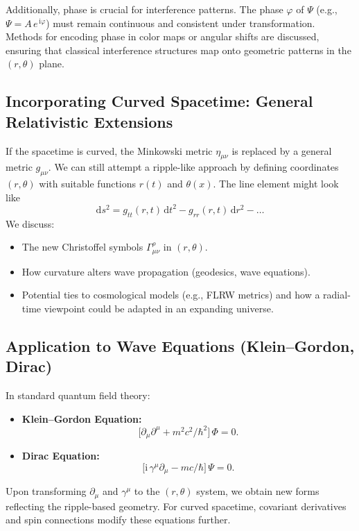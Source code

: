 \documentclass[11pt]{article}
\begin{document}
Additionally, phase is crucial for interference patterns. The phase 
\(\varphi\) of \(\Psi\) (e.g., \(\Psi = A \, e^{\,\mathrm{i}\varphi}\)) 
must remain continuous and consistent under transformation. Methods for 
encoding phase in color maps or angular shifts are discussed, ensuring 
that classical interference structures map onto geometric patterns in the 
\((r,\theta)\) plane.

\subsection{Incorporating Curved Spacetime: General Relativistic Extensions}
\label{subsec:curved-spacetime}
If the spacetime is curved, the Minkowski metric \(\eta_{\mu\nu}\) is 
replaced by a general metric \(g_{\mu\nu}\). We can still attempt a 
ripple-like approach by defining coordinates \((r,\theta)\) with 
suitable functions \(r(t)\) and \(\theta(x)\). The line element might 
look like
\[
  \mathrm{d}s^2 = g_{tt}(r,t)\,\mathrm{d}t^2 - g_{rr}(r,t)\,\mathrm{d}r^2 - \dots
\]
We discuss:
\begin{itemize}
  \item The new Christoffel symbols \(\Gamma^\rho_{\mu\nu}\) in \((r,\theta)\).
  \item How curvature alters wave propagation (geodesics, wave equations).
  \item Potential ties to cosmological models (e.g., FLRW metrics) and 
        how a radial-time viewpoint could be adapted in an expanding universe.
\end{itemize}

\subsection{Application to Wave Equations (Klein--Gordon, Dirac)}
\label{subsec:wave-equations}
In standard quantum field theory:
\begin{itemize}
  \item \textbf{Klein--Gordon Equation:} 
    \[
      \bigl[\partial_\mu\partial^\mu + m^2c^2/\hbar^2\bigr]\,\Phi = 0.
    \]
  \item \textbf{Dirac Equation:}
    \[
      \bigl[\mathrm{i}\,\gamma^\mu \partial_\mu - m c/\hbar\bigr]\,\Psi = 0.
    \]
\end{itemize}
Upon transforming \(\partial_\mu\) and \(\gamma^\mu\) to the \((r,\theta)\) system, 
we obtain new forms reflecting the ripple-based geometry. For curved spacetime, 
covariant derivatives and spin connections modify these equations further. 
\end{document}
